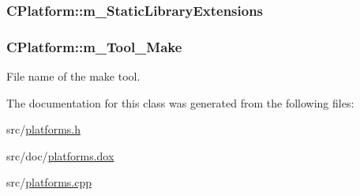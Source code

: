 \hypertarget{classCPlatform_a7ad50b7535d0a1518ef26619d4804700}{
\subsubsection[{m\-\_\-\-Static\-Library\-Extensions}]{ C\-Platform\-::m\-\_\-\-Static\-Library\-Extensions\hspace{0.3cm}{\ttfamily [private]}}}\label{classCPlatform_a7ad50b7535d0a1518ef26619d4804700}
\hypertarget{classCPlatform_a136a456b5a0293f11605917c177ca271}{
\subsubsection[{m\-\_\-\-Tool\-\_\-\-Make}]{\setlength{\rightskip}{0pt plus 5cm}C\-Platform\-::m\-\_\-\-Tool\-\_\-\-Make\hspace{0.3cm}{\ttfamily [private]}}}\label{classCPlatform_a136a456b5a0293f11605917c177ca271}


File name of the make tool. 



The documentation for this class was generated from the following files\-:\begin{DoxyCompactItemize}
\item 
src/\hyperlink{platforms_8h}{platforms.\-h}\item 
src/doc/\hyperlink{platforms_8dox}{platforms.\-dox}\item 
src/\hyperlink{platforms_8cpp}{platforms.\-cpp}\end{DoxyCompactItemize}
